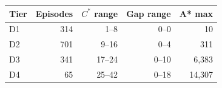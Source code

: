 \begin{tabular}{lrrrr}\toprule
Tier & Episodes & $C^*$ range & Gap range & A* max\\\midrule
D1 & 314 & 1--8 & 0--0 & 10\\
D2 & 701 & 9--16 & 0--4 & 311\\
D3 & 341 & 17--24 & 0--10 & 6,383\\
D4 & 65 & 25--42 & 0--18 & 14,307\\
\bottomrule\end{tabular}
